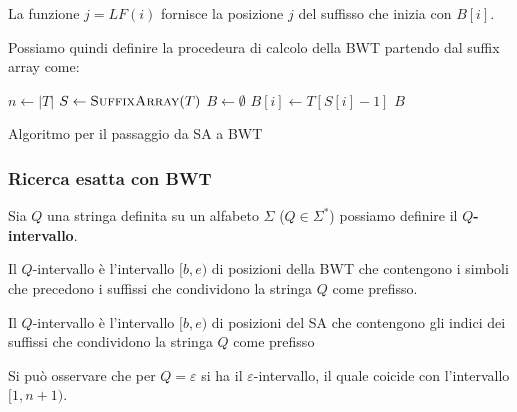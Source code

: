 La funzione $j = LF(i)$ fornisce la posizione $j$ del suffisso che inizia con $B[i]$.

Possiamo quindi definire la procedeura di calcolo della BWT partendo dal suffix
array come:
\begin{algorithm}
    \begin{algorithmic}
        \State $n \gets |T|$
        \State $S \gets \Call{SuffixArray}{T}$
        \State $B \gets \emptyset$
        \State $B[i] \gets T[S[i] - 1]$
        \EndFor
        \State \Return $B$
        \EndFunction
    \end{algorithmic}
    \caption{Algoritmo per il passaggio da SA a BWT}
\end{algorithm}
\subsubsection{Ricerca esatta con BWT}
Sia $Q$ una stringa definita su un alfabeto $\Sigma$ ($Q \in \Sigma^\ast$)
possiamo definire il \textbf{$Q$-intervallo}.
\begin{definizione} 
    Il $Q$-intervallo è l'intervallo $[b,e)$ di posizioni della BWT che contengono
    i simboli che precedono i suffissi che condividono la stringa $Q$ come prefisso.
\end{definizione}
\begin{definizione} 
    Il $Q$-intervallo è l'intervallo $[b,e)$ di posizioni del SA che contengono
    gli indici dei suffissi che condividono la stringa $Q$ come prefisso
\end{definizione}
Si può osservare che per $Q = \varepsilon$ si ha il $\varepsilon$-intervallo,
il quale coicide con l'intervallo $[1,n+1)$.

